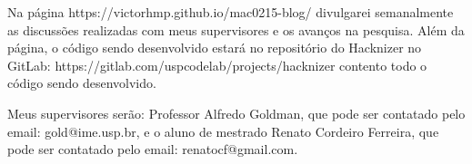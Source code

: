 \documentclass[10pt,twoside,a4paper]{article}
\begin{document}
    Na página https://victorhmp.github.io/mac0215-blog/ divulgarei semanalmente as discussões realizadas com meus supervisores e os avanços na pesquisa. Além da página, o código sendo desenvolvido estará no repositório do Hacknizer no GitLab: https://gitlab.com/uspcodelab/projects/hacknizer contento todo o código sendo desenvolvido.
    
    Meus supervisores serão: Professor Alfredo Goldman, que pode ser contatado pelo email: gold@ime.usp.br, e o aluno de mestrado Renato Cordeiro Ferreira, que pode ser contatado pelo email: renatocf@gmail.com.
    



\end{document}
